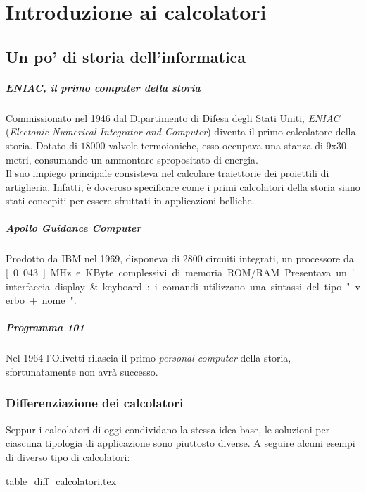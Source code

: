 \documentclass[class=book, crop=false]{standalone}
\begin{document}
\chapter{Introduzione ai calcolatori}
\section{Un po' di storia dell'informatica}
\paragraph{ENIAC, il primo computer della storia}
Commissionato nel 1946 dal Dipartimento di Difesa degli Stati Uniti, \emph{ENIAC} (\emph{Electonic Numerical Integrator and Computer}) diventa il primo calcolatore della storia.
Dotato di $18000$ valvole termoioniche, esso occupava una stanza di 9x30 metri, consumando un ammontare spropositato di energia.\\
Il suo impiego principale consisteva nel calcolare traiettorie dei proiettili di artiglieria. Infatti, è doveroso specificare come i primi calcolatori della storia siano stati concepiti per essere sfruttati in applicazioni belliche.

\paragraph{Apollo Guidance Computer}
Prodotto da IBM nel 1969, disponeva di 2800 circuiti integrati, un processore da \unit[0.043]{MHz} e \unit[152]{KByte}  complessivi di memoria ROM/RAM. Presentava un'interfaccia display\&keyboard: i comandi utilizzano una sintassi del tipo "verbo + nome".

\paragraph{Programma 101} Nel 1964 l'Olivetti rilascia il primo \emph{personal computer} della storia, sfortunatamente non avrà successo.

\subsection{Differenziazione dei calcolatori}
Seppur i calcolatori di oggi condividano la stessa idea base, le soluzioni per ciascuna tipologia di applicazione sono piuttosto diverse. A seguire alcuni esempi di diverso tipo di calcolatori:

\begin{table}[H]
	\centering
	{table_diff_calcolatori.tex}
\end{table}
\end{document}
